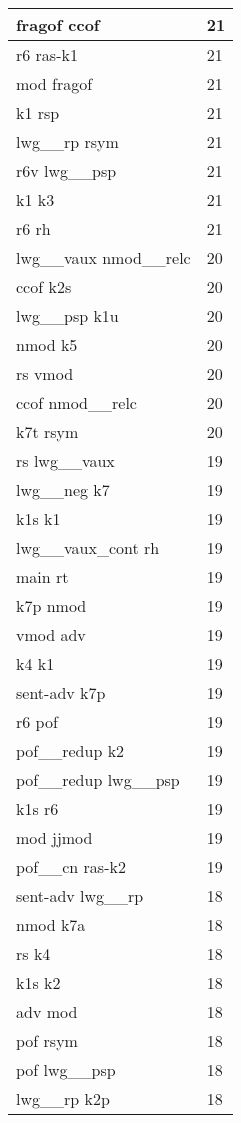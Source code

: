 \documentclass[a4 paper]{article}
\begin{document}
\begin{longtable}{p{}p{}}
fragof ccof  & 21 \\ \midrule
r6 ras-k1  & 21 \\ \midrule
mod fragof  & 21 \\ \midrule
k1 rsp  & 21 \\ \midrule
lwg\_\_rp rsym  & 21 \\ \midrule
r6v lwg\_\_psp  & 21 \\ \midrule
k1 k3  & 21 \\ \midrule
r6 rh  & 21 \\ \midrule
lwg\_\_vaux nmod\_\_relc  & 20 \\ \midrule
ccof k2s  & 20 \\ \midrule
lwg\_\_psp k1u  & 20 \\ \midrule
nmod k5  & 20 \\ \midrule
rs vmod  & 20 \\ \midrule
ccof nmod\_\_relc  & 20 \\ \midrule
k7t rsym  & 20 \\ \midrule
rs lwg\_\_vaux  & 19 \\ \midrule
lwg\_\_neg k7  & 19 \\ \midrule
k1s k1  & 19 \\ \midrule
lwg\_\_vaux\_cont rh  & 19 \\ \midrule
main rt  & 19 \\ \midrule
k7p nmod  & 19 \\ \midrule
vmod adv  & 19 \\ \midrule
k4 k1  & 19 \\ \midrule
sent-adv k7p  & 19 \\ \midrule
r6 pof  & 19 \\ \midrule
pof\_\_redup k2  & 19 \\ \midrule
pof\_\_redup lwg\_\_psp  & 19 \\ \midrule
k1s r6  & 19 \\ \midrule
mod jjmod  & 19 \\ \midrule
pof\_\_cn ras-k2  & 19 \\ \midrule
sent-adv lwg\_\_rp  & 18 \\ \midrule
nmod k7a  & 18 \\ \midrule
rs k4  & 18 \\ \midrule
k1s k2  & 18 \\ \midrule
adv mod  & 18 \\ \midrule
pof rsym  & 18 \\ \midrule
pof lwg\_\_psp  & 18 \\ \midrule
lwg\_\_rp k2p  & 18 \\ \midrule

\end{longtable}
\end{document}
